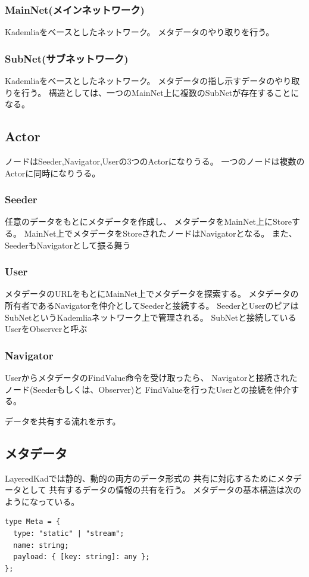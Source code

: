 \documentclass[sotsuron]{jcsie}
\begin{document}
\subsubsection{MainNet(メインネットワーク)}
Kademliaをベースとしたネットワーク。
メタデータのやり取りを行う。
\subsubsection{SubNet(サブネットワーク)}
Kademliaをベースとしたネットワーク。
メタデータの指し示すデータのやり取りを行う。
構造としては、一つのMainNet上に複数のSubNetが存在することになる。

\subsection{Actor}
ノードはSeeder,Navigator,Userの3つのActorになりうる。
一つのノードは複数のActorに同時になりうる。
\subsubsection{Seeder}
任意のデータをもとにメタデータを作成し、
メタデータをMainNet上にStoreする。
MainNet上でメタデータをStoreされたノードはNavigatorとなる。
また、SeederもNavigatorとして振る舞う
\subsubsection{User}
メタデータのURLをもとにMainNet上でメタデータを探索する。
メタデータの所有者であるNavigatorを仲介としてSeederと接続する。
SeederとUserのピアはSubNetというKademliaネットワーク上で管理される。
SubNetと接続しているUserをObserverと呼ぶ
\subsubsection{Navigator}
UserからメタデータのFindValue命令を受け取ったら、
Navigatorと接続されたノード(Seederもしくは、Observer)と
FindValueを行ったUserとの接続を仲介する。

データを共有する流れを示す。

\subsection{メタデータ}
LayeredKadでは静的、動的の両方のデータ形式の
共有に対応するためにメタデータとして
共有するデータの情報の共有を行う。
メタデータの基本構造は次のようになっている。
\begin{lstlisting}
type Meta = {
  type: "static" | "stream";
  name: string;
  payload: { [key: string]: any };
};
\end{lstlisting}
\end{document}
